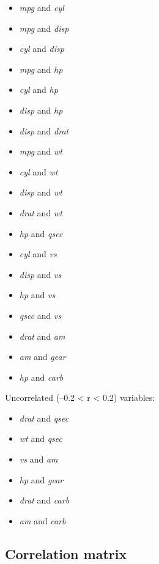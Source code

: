 \documentclass{article}
\begin{document}
\begin{itemize}
\item
  \emph{mpg} and \emph{cyl}
\item
  \emph{mpg} and \emph{disp}
\item
  \emph{cyl} and \emph{disp}
\item
  \emph{mpg} and \emph{hp}
\item
  \emph{cyl} and \emph{hp}
\item
  \emph{disp} and \emph{hp}
\item
  \emph{disp} and \emph{drat}
\item
  \emph{mpg} and \emph{wt}
\item
  \emph{cyl} and \emph{wt}
\item
  \emph{disp} and \emph{wt}
\item
  \emph{drat} and \emph{wt}
\item
  \emph{hp} and \emph{qsec}
\item
  \emph{cyl} and \emph{vs}
\item
  \emph{disp} and \emph{vs}
\item
  \emph{hp} and \emph{vs}
\item
  \emph{qsec} and \emph{vs}
\item
  \emph{drat} and \emph{am}
\item
  \emph{am} and \emph{gear}
\item
  \emph{hp} and \emph{carb}
\end{itemize}
Uncorrelated (--0.2 \textless{} r \textless{} 0.2) variables:

\begin{itemize}
\item
  \emph{drat} and \emph{qsec}
\item
  \emph{wt} and \emph{qsec}
\item
  \emph{vs} and \emph{am}
\item
  \emph{hp} and \emph{gear}
\item
  \emph{drat} and \emph{carb}
\item
  \emph{am} and \emph{carb}
\end{itemize}
\subsection{Correlation matrix}
\end{document}
